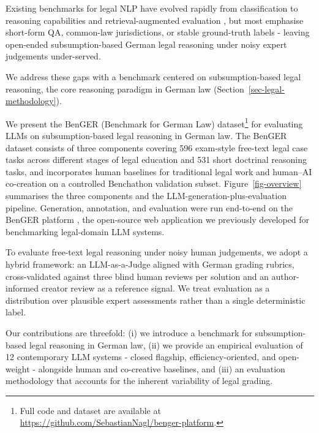 \documentclass[11pt]{article}
\begin{document}
Existing benchmarks for legal NLP have evolved rapidly from
classification \citep{chalkidis2022lexglue, guha2023legalbench} to
reasoning capabilities
\citep{fei2024lawbench, fan2026lexam, jia2025readyjuristone, shi2026plawbench}
and retrieval-augmented evaluation
\citep{pipitone2024legalbenchrag, butler2026legalragbench}, but most
emphasise short-form QA, common-law jurisdictions, or stable
ground-truth labels - leaving open-ended subsumption-based German legal
reasoning under noisy expert judgements under-served.

We address these gaps with a benchmark centered on subsumption-based
legal reasoning, the core reasoning paradigm in German law
(Section~\ref{sec-legal-methodology}).

We present the BenGER (Benchmark for German Law) dataset\footnote{Full
  code and dataset are available at
  \url{https://github.com/SebastianNagl/benger-platform}.} for
evaluating LLMs on subsumption-based legal reasoning in German law. The
BenGER dataset consists of three components covering 596 exam-style
free-text legal case tasks across different stages of legal education
and 531 short doctrinal reasoning tasks, and incorporates human
baselines for traditional legal work and human--AI co-creation on a
controlled Benchathon validation subset. Figure~\ref{fig-overview}
summarises the three components and the LLM-generation-plus-evaluation
pipeline. Generation, annotation, and evaluation were run end-to-end on
the BenGER platform \citep{nagl2026benger}, the open-source web
application we previously developed for benchmarking legal-domain LLM
systems.

To evaluate free-text legal reasoning under noisy human judgements, we
adopt a hybrid framework: an LLM-as-a-Judge aligned with German grading
rubrics, cross-validated against three blind human reviews per solution
and an author-informed creator review as a reference signal. We treat
evaluation as a distribution over plausible expert assessments rather
than a single deterministic label.

Our contributions are threefold: (i) we introduce a benchmark for
subsumption-based legal reasoning in German law, (ii) we provide an
empirical evaluation of 12 contemporary LLM systems - closed flagship,
efficiency-oriented, and open-weight - alongside human and co-creative
baselines, and (iii) an evaluation methodology that accounts for the
inherent variability of legal grading.
\end{document}
